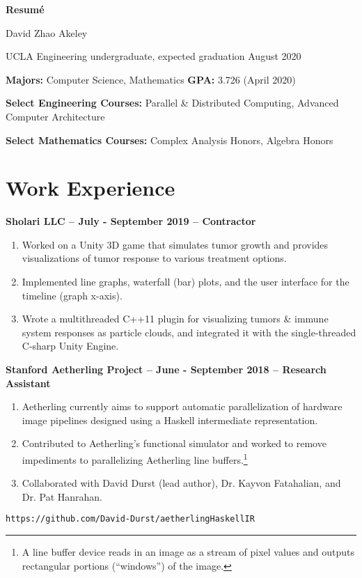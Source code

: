 \documentclass[11pt]{article}
\begin{document}
\begin{center}
\Large{\textbf{Resum\'e}}

\normalsize David Zhao Akeley

UCLA Engineering undergraduate, expected graduation August 2020
\end{center}


\textbf{Majors:} Computer Science, Mathematics
\quad \textbf{GPA:} 3.726 (April 2020)

\textbf{Select Engineering Courses:} Parallel \& Distributed Computing,
Advanced Computer Architecture

\textbf{Select Mathematics Courses:} Complex Analysis Honors, Algebra Honors

\section{Work Experience}

\textbf{Sholari LLC -- July - September 2019 -- Contractor}
\begin{enumerate}
\item Worked on a Unity 3D game that simulates tumor growth and
  provides visualizations of tumor response to various treatment
  options.
\item Implemented line graphs, waterfall (bar) plots, and the user
  interface for the timeline (graph x-axis).
\item Wrote a multithreaded C++11 plugin for visualizing tumors \&
  immune system responses as particle clouds, and integrated it with
  the single-threaded C-sharp Unity Engine.
\end{enumerate}

\textbf{Stanford Aetherling Project -- June - September 2018 --
  Research Assistant}
\begin{enumerate}
\item Aetherling currently aims to support automatic parallelization
  of hardware image pipelines designed using a Haskell intermediate
  representation.
\item Contributed to Aetherling's functional simulator and worked to
  remove impediments to parallelizing Aetherling line
  buffers.\footnote{A line buffer device reads in an image as a stream
    of pixel values and outputs rectangular portions (``windows'') of
    the image.}
\item Collaborated with David Durst (lead author), Dr. Kayvon
  Fatahalian, and Dr. Pat Hanrahan.
\end{enumerate}
\quad\texttt{https://github.com/David-Durst/aetherlingHaskellIR}
\end{document}
